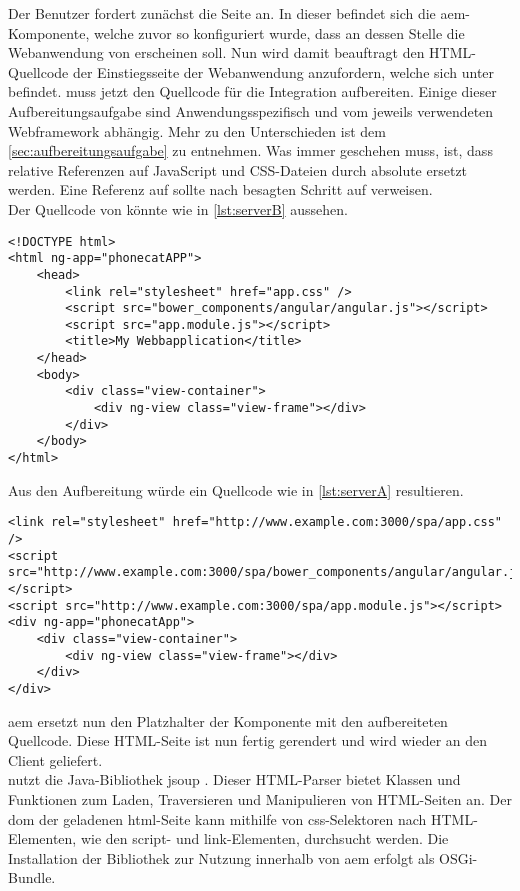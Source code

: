 \label{sec:html-seite-aufbereiten}

Der Benutzer fordert zunächst die Seite \serverA an. In dieser befindet sich die \ac{aem}-Komponente, welche zuvor so konfiguriert wurde, dass an dessen Stelle die Webanwendung von \serverB erscheinen soll. Nun wird  damit beauftragt den HTML-Quellcode der Einstiegsseite der Webanwendung anzufordern, welche sich unter  befindet.  muss jetzt den Quellcode für die Integration aufbereiten. Einige dieser Aufbereitungsaufgabe sind Anwendungsspezifisch und vom jeweils verwendeten Webframework abhängig. Mehr zu den Unterschieden ist dem \autoref{sec:aufbereitungsaufgabe} zu entnehmen. Was immer geschehen muss, ist, dass relative Referenzen auf JavaScript und CSS-Dateien durch absolute ersetzt werden. Eine Referenz auf  sollte nach besagten Schritt auf  verweisen.\\
Der Quellcode von  könnte wie in \autoref{lst:serverB} aussehen.

\begin{lstlisting}[style=htmlcssjs, caption=Ausgangssituation auf Server B, label=lst:serverB]
<!DOCTYPE html>
<html ng-app="phonecatAPP">
	<head>
		<link rel="stylesheet" href="app.css" />
		<script src="bower_components/angular/angular.js"></script>
		<script src="app.module.js"></script>
		<title>My Webbapplication</title>
	</head>
	<body>
		<div class="view-container">
			<div ng-view class="view-frame"></div>
		</div>
	</body>
</html>
\end{lstlisting}

Aus den Aufbereitung würde ein Quellcode wie in \autoref{lst:serverA} resultieren.

\begin{lstlisting}[style=htmlcssjs, caption=Aufbereiteter Quellcode, label=lst:serverA]
<link rel="stylesheet" href="http://www.example.com:3000/spa/app.css" />
<script src="http://www.example.com:3000/spa/bower_components/angular/angular.js"></script>
<script src="http://www.example.com:3000/spa/app.module.js"></script>
<div ng-app="phonecatApp">
	<div class="view-container">
		<div ng-view class="view-frame"></div>
	</div>
</div>

\end{lstlisting}

\ac{aem} ersetzt nun den Platzhalter der Komponente mit den aufbereiteten Quellcode. Diese HTML-Seite ist nun fertig gerendert und wird wieder an den Client geliefert. \\
 nutzt die Java-Bibliothek jsoup \cite{Hedley2016}. Dieser HTML-Parser bietet Klassen und Funktionen zum Laden, Traversieren und Manipulieren von HTML-Seiten an. Der \ac{dom} der geladenen \ac{html}-Seite kann mithilfe von \ac{css}-Selektoren nach HTML-Elementen, wie den script- und link-Elementen, durchsucht werden. Die Installation der Bibliothek zur Nutzung innerhalb von \ac{aem} erfolgt als OSGi-Bundle.